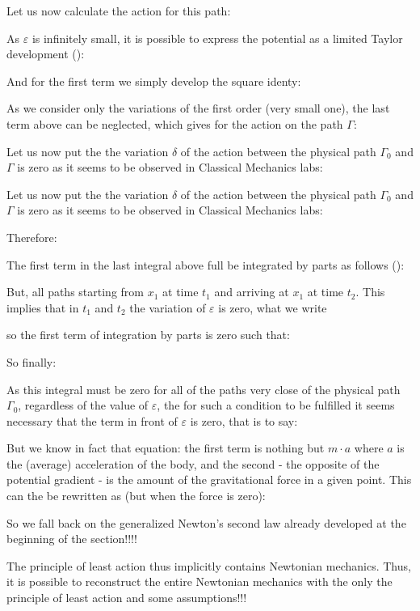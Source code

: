 	Let us now calculate the action for this path:
	
	As $\varepsilon$ is infinitely small, it is possible to express the potential as a limited Taylor development ():
	
	And for the first term we simply develop the square identy:
	
	As we consider only the variations of the first order (very small one), the last term above can be neglected, which gives for the action on the path $\Gamma$:
	
	Let us now put the the variation $\delta$ of the action between the physical path $\Gamma_0$ and $\Gamma$ is zero as it seems to be observed in Classical Mechanics labs:
	
	Let us now put the the variation $\delta$ of the action between the physical path $\Gamma_0$ and $\Gamma$ is zero as it seems to be observed in Classical Mechanics labs:
	
	Therefore:
	
	The first term in the last integral above full be integrated by parts as follows ():
	
	But, all paths starting from $x_1$ at time $t_1$ and arriving at $x_1$ at time $t_2$. This implies that in $t_1$ and $t_2$ the variation of $\varepsilon$ is zero, what we write
	
	so the first term of integration by parts is zero such that:
	
	So finally:
	
	As this integral must be zero for all of the paths very close of the physical path $\Gamma_0$, regardless of the value of $\varepsilon$, the for such a condition to be fulfilled it seems necessary that the term in front of $\varepsilon$ is zero, that is to say:
	
	But we know in fact that equation: the first term is nothing but $m\cdot a$ where $a$ is the (average) acceleration of the body, and the second - the opposite of the potential gradient - is the amount of the gravitational force in a given point. This can the be rewritten as (but when the force is zero):
	
	So we fall back on the generalized Newton's second law already developed at the beginning of the section!!!!
	
	The principle of least action thus implicitly contains Newtonian mechanics. Thus, it is possible to reconstruct the entire Newtonian mechanics with the only the principle of least action and some assumptions!!!

